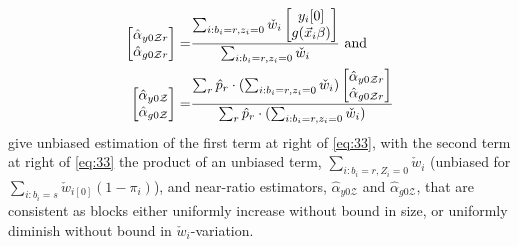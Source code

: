 \documentclass{article}
\newcommand{\owt}[1][{[z_{i}]}]{\ensuremath{\check{w}_{i#1}}}
\begin{document}
  \begin{align*}
  \begin{bmatrix} \hat{\alpha}_{y0\mathcal{Z}r}\\ \hat{\alpha}_{g0\mathcal{Z}r}
  \end{bmatrix}
    =&
  \frac{\sum_{i: b_{i}=r, z_{i}=0}\owt[]\begin{bmatrix}y_{i}[0]\\
                               g(\vec{x}_{i}\beta)\end{bmatrix}}{\sum_{i:b_{i}=r,
                               z_{i}=0}\owt[]} \text{ and}\\
    \begin{bmatrix} \hat{\alpha}_{y0\mathcal{Z}}\\ \hat{\alpha}_{g0\mathcal{Z}}
    \end{bmatrix} =&
  \frac{\sum_{r}\hat{p}_{r}\cdot (\sum_{i: b_{i}=r, z_{i}=0}\owt[]) \begin{bmatrix} \hat{\alpha}_{y0\mathcal{Z}r}\\ \hat{\alpha}_{g0\mathcal{Z}r}
  \end{bmatrix}}{%
    \sum_{r}\hat{p}_{r} \cdot (\sum_{i: b_{i}=r, z_{i}=0}\owt[])}
  \end{align*}
  give unbiased estimation of the first term at right of
  \eqref{eq:33}, with the second term at right of
  \eqref{eq:33} the product of an unbiased term, $\sum_{i: b_{i}=r,
    Z_{i}=0}\owt[]$ (unbiased for $\sum_{i:
    b_{i}=s}\owt[{[0]}](1-\pi_{i})$), 
  and near-ratio estimators, $\hat{\alpha}_{y0\mathcal{Z}}$ and
  $\hat{\alpha}_{g0\mathcal{Z}}$, that
    are consistent as blocks either uniformly increase without bound in size,
or uniformly diminish without bound in $\owt[]$-variation.
\end{document}
